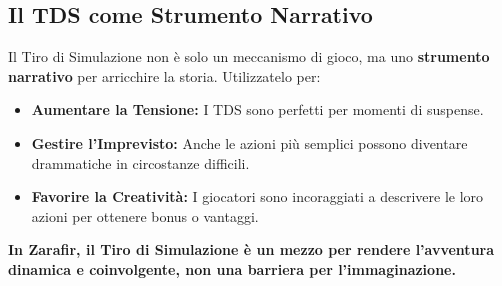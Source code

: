 \documentclass[../manuale_main.tex]{subfiles}
\begin{document}
\subsection{Il TDS come Strumento Narrativo}
Il Tiro di Simulazione non è solo un meccanismo di gioco, ma uno \textbf{strumento narrativo} per arricchire la storia. Utilizzatelo per:

\begin{itemize}
    \item \textbf{Aumentare la Tensione:} I TDS sono perfetti per momenti di suspense.
    \item \textbf{Gestire l'Imprevisto:} Anche le azioni più semplici possono diventare drammatiche in circostanze difficili.
    \item \textbf{Favorire la Creatività:} I giocatori sono incoraggiati a descrivere le loro azioni per ottenere bonus o vantaggi.
\end{itemize}

\textbf{In Zarafir, il Tiro di Simulazione è un mezzo per rendere l’avventura dinamica e coinvolgente, non una barriera per l’immaginazione.}
\end{document}
